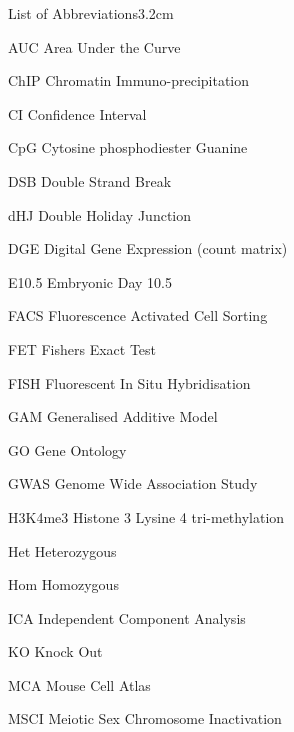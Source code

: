 \begin{mclistof}{List of Abbreviations}{3.2cm}

\item[AUC] Area Under the Curve

\item[ChIP] Chromatin Immuno-precipitation

\item[CI] Confidence Interval

\item[CpG] Cytosine phosphodiester Guanine

\item[DSB] Double Strand Break

\item[dHJ] Double Holiday Junction

\item[DGE] Digital Gene Expression (count matrix)

\item[E10.5] Embryonic Day 10.5

\item[FACS] Fluorescence Activated Cell Sorting

\item[FET] Fishers Exact Test

\item[FISH] Fluorescent In Situ Hybridisation

\item[GAM] Generalised Additive Model

\item[GO] Gene Ontology

\item[GWAS] Genome Wide Association Study

\item[H3K4me3] Histone 3 Lysine 4 tri-methylation

\item[Het] Heterozygous

\item[Hom] Homozygous

\item[ICA] Independent Component Analysis

\item[KO] Knock Out

\item[MCA] Mouse Cell Atlas

\item[MSCI] Meiotic Sex Chromosome Inactivation


\end{mclistof}
